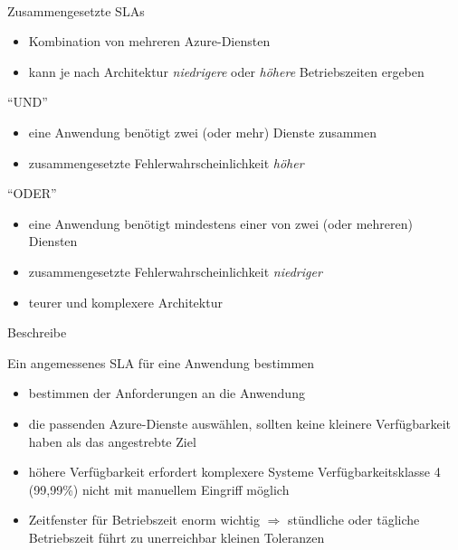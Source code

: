 \documentclass{scrartcl}
\newenvironment{flashcard}[2][]{%
    #1
    \vfill
    \centerline{\Large{#2}}
    \vfill
\newpage
}
{\newpage}
\begin{document}
    \begin{flashcard}[\ ]{Zusammengesetzte SLAs}
        \begin{itemize}
            \item Kombination von mehreren Azure-Diensten
            \item kann je nach Architektur \emph{niedrigere} oder \emph{höhere} Betriebszeiten ergeben
        \end{itemize}
        ``UND''
        \begin{itemize}
            \item eine Anwendung benötigt zwei (oder mehr) Dienste zusammen
            \item zusammengesetzte Fehlerwahrscheinlichkeit \emph{höher}
        \end{itemize}
        ``ODER''
        \begin{itemize}
            \item eine Anwendung benötigt mindestens einer von zwei (oder mehreren) Diensten
            \item zusammengesetzte Fehlerwahrscheinlichkeit \emph{niedriger}
            \item teurer und komplexere Architektur
        \end{itemize}
    \end{flashcard}

    \begin{flashcard}[Beschreibe]{Ein angemessenes SLA für eine Anwendung bestimmen}
            \begin{itemize}
                \item bestimmen der Anforderungen an die Anwendung
                \item die passenden Azure-Dienste auswählen, sollten keine kleinere Verfügbarkeit haben als das angestrebte Ziel
                \item höhere Verfügbarkeit erfordert komplexere Systeme\newline
                Verfügbarkeitsklasse 4 (99,99\%) nicht mit manuellem Eingriff möglich
                \item Zeitfenster für Betriebszeit enorm wichtig\newline
                $\Rightarrow$ stündliche oder tägliche Betriebszeit führt zu unerreichbar kleinen Toleranzen
            \end{itemize}
    \end{flashcard}
\end{document}
